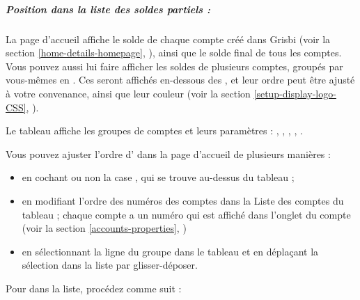 \subparagraph{Position dans la liste des soldes partiels :\label{setup-general-home-partBalance}}

La page d'accueil affiche le solde de chaque compte créé dans Grisbi (voir la section \vref{home-details-homepage}, ), ainsi que le solde final de tous les comptes. Vous pouvez aussi lui faire afficher les soldes de plusieurs comptes, groupés par vous-mêmes en . Ces  seront affichés en-dessous des , et leur ordre peut être ajusté à votre convenance, ainsi que leur couleur (voir la section \vref{setup-display-logo-CSS}, ).

Le tableau affiche les groupes de comptes et leurs paramètres : , , , , .

Vous pouvez ajuster l'ordre d' dans la page d'accueil de plusieurs manières :

\begin{itemize}
	\item en cochant ou non la case , qui se trouve au-dessus du tableau ;
	\item en modifiant l'ordre des numéros des comptes dans la Liste des comptes du tableau ; chaque compte a un numéro qui est affiché dans l'onglet  du compte (voir la section \vref{accounts-properties}, )
	\item en sélectionnant la ligne du groupe dans le tableau et en déplaçant la sélection dans la liste par glisser-déposer.
\end{itemize}

\ifIllustration
\newpage
\fi


Pour  dans la liste, procédez comme suit :

